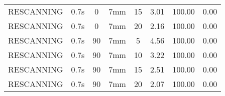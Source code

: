 \begin{table}[H]
\begin{tabular}{|c||c|c|c|c||c|c|c|}
RESCANNING & 0.7s & 0 & 7mm & 15 & 3.01 & 100.00 & 0.00 \\
RESCANNING & 0.7s & 0 & 7mm & 20 & 2.16 & 100.00 & 0.00 \\
RESCANNING & 0.7s & 90 & 7mm & 5 & 4.56 & 100.00 & 0.00 \\
RESCANNING & 0.7s & 90 & 7mm & 10 & 3.22 & 100.00 & 0.00 \\
RESCANNING & 0.7s & 90 & 7mm & 15 & 2.51 & 100.00 & 0.00 \\
RESCANNING & 0.7s & 90 & 7mm & 20 & 2.07 & 100.00 & 0.00 \\
    \hline\hline 
  \end{tabular}
  \label{tab:Pat05_LPV}
\end{table}

\newpage
\thispagestyle{realempty}
\vspace*{-2cm}

